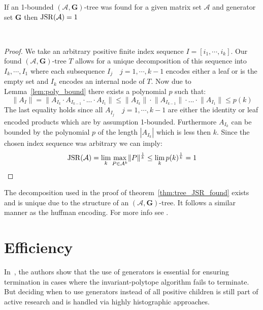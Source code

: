 \begin{theorem}
\label{thm:tree_JSR_found}
    If an 1-bounded $(\mathcal{A},\mathbf{G})\text{-tree}$ was found for a given matrix set $\mathcal{A}$ and generator set $\mathbf{G}$ then $\operatorname{JSR}(\mathcal{A}) = 1$
\end{theorem}
~
\begin{proof}
    We take an arbitrary positive finite index sequence $I = [i_1, \cdots, i_k]$.
    Our found $(\mathcal{A},\mathbf{G})\text{-tree } T$ allows for a unique decomposition of this sequence into $I_k, \cdots, I_1$ where each subsequence $I_j \quad j = 1, \cdots,k-1$ encodes either a leaf or is the empty set and $I_k$ encodes an internal node of $T$. Now due to Lemma~\ref{lem:poly_bound} there exists a polynomial $p$ such that:
    \[ 
        \lVert A_{I}  \rVert =  \lVert A_{I_k} \cdot A_{I_{k-1}} \cdot ... \cdot A_{I_1}  \rVert \le  \lVert A_{I_k} \rVert \cdot \lVert A_{I_{k-1}}\rVert \cdot ... \cdot \lVert A_{I_1} \rVert \le p(k) 
    \]
    The last equality holds since all $A_{I_j} \quad j = 1, \cdots,k-1$ are either the identity or leaf encoded products which are by assumption 1-bounded. 
    Furthermore $A_{I_k}$ can be bounded by the polynomial $p$ of the length $|A_{I_k}|$ which is less then $k$. 
    Since the chosen index sequence was arbitrary we can imply: 
      $$\operatorname{JSR}(\mathcal{A}) = \lim_k \max_{P \in \mathcal{A}^k} \lVert P \rVert ^{\frac{1}{k}} \leq \lim_k p(k) ^{\frac{1}{k}}  = 1$$
\end{proof}

\begin{remark}
    The decomposition used in the proof of theorem~\ref{thm:tree_JSR_found} exists and is unique due to the structure of an $(\mathcal{A},\mathbf{G})\text{-tree}$.
    It follows a similar manner as the huffman encoding. 
    For more info see \citep{mollerTreebasedApproachJoint2014}.
\end{remark}

\section{Efficiency}


\begin{remark}
    In~\citep{mollerTreebasedApproachJoint2014}, the authors show that the use of generators is essential for ensuring termination in cases where the invariant-polytope algorithm fails to terminate. But deciding when to use generators instead of all positive children is still part of active research and is handled via highly histographic approaches. 
\end{remark}

